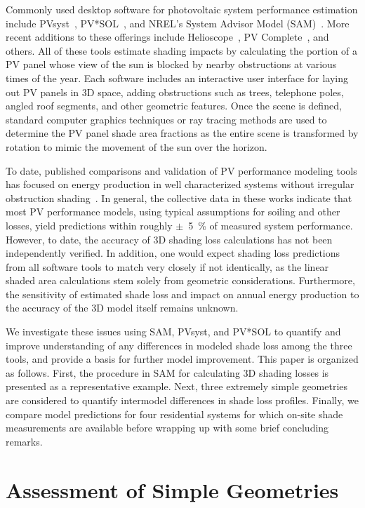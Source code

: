 \documentclass[twocolumn,10pt]{asme2ej}
\begin{document}
Commonly used desktop software for photovoltaic system performance estimation include PVsyst~\cite{pvsyst}, PV*SOL~\cite{pvsol}, and NREL's System Advisor Model (SAM)~\cite{sam}.  More recent additions to these offerings include Helioscope~\cite{helioscope}, PV Complete~\cite{pvcomplete}, and others.  All of these tools estimate shading impacts by calculating the portion of a PV panel whose view of the sun is blocked by nearby obstructions at various times of the year.  Each software includes an interactive user interface for laying out PV panels in 3D space, adding obstructions such as trees, telephone poles, angled roof segments, and other geometric features.  Once the scene is defined, standard computer graphics techniques or ray tracing methods are used to determine the PV panel shade area fractions as the entire scene is transformed by rotation to mimic the movement of the sun over the horizon.

To date, published comparisons and validation of PV performance modeling tools has focused on energy production in well characterized systems without irregular obstruction shading~\cite{blair2013,freeman2013,freeman2014,haroon2012,yates2010}.  In general, the collective data in these works indicate that most PV performance models, using typical assumptions for soiling and other losses, yield predictions within roughly $\pm$~5~\% of measured system performance.  However, to date, the accuracy of 3D shading loss calculations has not been independently verified.  In addition, one would expect shading loss predictions from all software tools to match very closely if not identically, as the linear shaded area calculations stem solely from geometric considerations.  Furthermore, the sensitivity of estimated shade loss and impact on annual energy production to the accuracy of the 3D model itself remains unknown.

We investigate these issues using SAM, PVsyst, and PV*SOL to quantify and improve understanding of any differences in modeled shade loss among the three tools, and provide a basis for further model improvement.  This paper is organized as follows.  First, the procedure in SAM for calculating 3D shading losses is presented as a representative example.  Next, three extremely simple geometries are considered to quantify intermodel differences in shade loss profiles.  Finally, we compare model predictions for four residential systems for which on-site shade measurements are available before wrapping up with some brief concluding remarks.

\section{Assessment of Simple Geometries}
\end{document}
